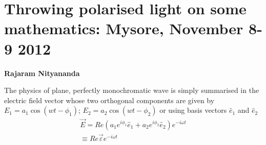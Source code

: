 \chapter[Throwing polarised light on some mathematics: Mysore, November 8-9 2012]{Throwing polarised light on some mathematics: Mysore, November 8-9 2012}\label{chap26}


\begin{center}
\textbf{Rajaram Nityananda}
\end{center}

The physics of plane, perfectly monochromatic wave is simply summarised
in the electric field vector whose two orthogonal components are given by
$E_1 = a_1 \cos(wt - \phi_1)$; $E_2 = a_2 \cos(wt - \phi_2)$ or using basis vectors $\hat{e}_1$ and $\hat{e}_2$
\begin{gather*}
\overrightarrow{E} = Re (a_1 e^{i \phi_1 } \hat{e}_1 + a_2 e^{i\phi_2} \hat{e}_2 ) e^{-i\omega t} \\
\equiv Re \overrightarrow{\varepsilon} e^{-i\omega t}
\end{gather*}

